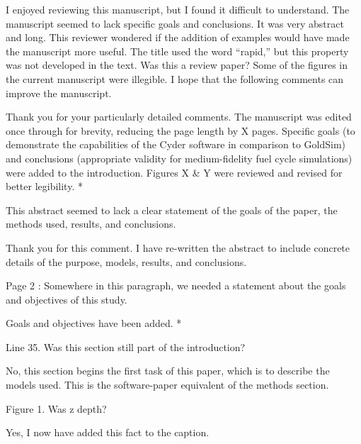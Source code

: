 \documentclass[answers,12pt]{exam}
\begin{document}
\begin{questions}
\question I enjoyed reviewing this manuscript, but I found it difficult to understand.
The manuscript seemed to lack specific goals and conclusions. It was very
abstract and long.  This reviewer wondered if the addition of examples would
have made the manuscript more useful. The title used the word ``rapid,'' but this
property was not developed in the text. Was this a review paper? Some of the
figures in the current manuscript were illegible. I hope that the following
comments can improve the manuscript.
\begin{solution}
Thank you for your particularly detailed comments. The manuscript was edited 
        once through for brevity, reducing the page length by X pages. Specific 
        goals (to demonstrate the capabilities of the Cyder software in 
        comparison to GoldSim) and conclusions (appropriate validity for 
        medium-fidelity fuel cycle simulations) were added to the introduction. 
        Figures X \& Y were reviewed and revised for better legibility.
        {\color{red}*}
\end{solution}

\question This abstract seemed to lack a clear statement of the goals of the paper, the methods used, results, and conclusions.
\begin{solution}
Thank you for this comment. I have re-written the abstract to include concrete 
details of the purpose, models, results, and conclusions. 
\end{solution}

\question Page 2 : Somewhere in this paragraph, we needed a statement about the goals and objectives of this study.
\begin{solution}
Goals and objectives have been added. 
        {\color{red}*}
\end{solution}


\question Line 35. Was this section still part of the introduction?

\begin{solution}
No, this section begins the first task of this paper, which is to describe the 
models used. This is the software-paper equivalent of the methods section.
\end{solution}

\question Figure 1. Was z depth?
\begin{solution}
Yes, I now have added this fact to the caption.
\end{solution}


\end{questions}
\end{document}

